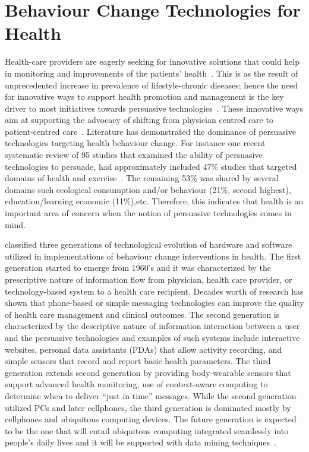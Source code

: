 \section{Behaviour Change Technologies for Health}
Health-care providers are eagerly seeking for innovative solutions that could help in monitoring and improvements of the patients' health~\citep{higgins2016smartphone}. This is as the result of unprecedented increase in prevalence of lifestyle-chronic diseases; hence the need for innovative ways to support health promotion and management is the key driver to most initiatives towards persuasive technologies~\citep{arsand:mobile}. These innovative ways aim at supporting the advocacy of shifting from physician centred care to patient-centred care~\citep{higgins2016smartphone,korhonen2010personal}. Literature has demonstrated the dominance of persuasive technologies targeting health behaviour change. For instance one recent systematic review of 95 studies that examined the ability of persuasive technologies to persuade, had approximately included 47\% studies that  targeted domains of health and exercise~\citep{hamari2014persuasive}. The remaining 53\% was shared by several domains such ecological consumption and/or behaviour (21\%, second highest), education/learning economic (11\%),etc. Therefore, this indicates that health is an important area of concern when the notion of persuasive technologies comes in mind.

\cite{chatterjee2009healthy} classified three generations  of technological evolution of hardware and software utilized in implementations of behaviour change interventions in health. The first generation started to emerge from 1960's and it was characterized by the prescriptive nature of information flow from physician, health care provider, or technology-based system to a health care recipient. Decades worth of research has shown that phone-based or simple messaging technologies can improve the quality of health care management and clinical outcomes. The second generation is characterized by the descriptive nature of information interaction between a user and the persuasive technologies and examples of such systems include interactive websites, personal data assistants (PDAs) that allow activity recording, and simple sensors that record and report basic health parameters. The third generation extends second generation by providing body-wearable sensors that support advanced health monitoring, use of context-aware computing to determine when to deliver “just in time” messages.  While the second generation utilized PCs and later cellphones, the third generation is dominated mostly by cellphones and ubiquitous computing devices. The future generation is expected to be the one that will entail ubiquitous computing integrated seamlessly into people's daily lives and it will be supported with data mining techniques~\citep{chatterjee2009healthy}.

